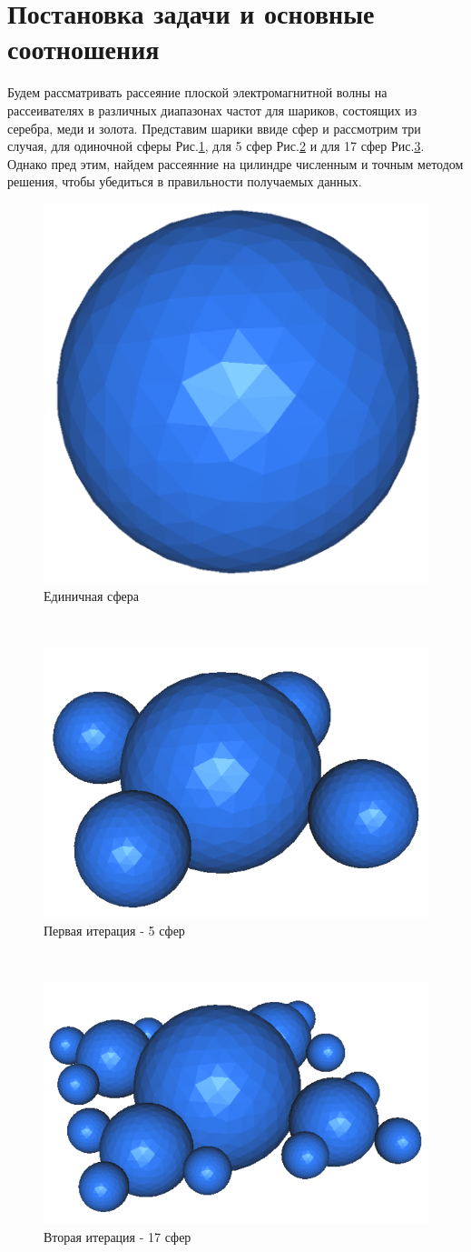 \section{Постановка задачи и основные соотношения}
Будем рассматривать рассеяние плоской электромагнитной волны на рассеивателях в различных диапазонах частот для шариков, состоящих из серебра, меди и золота. Представим шарики ввиде сфер и рассмотрим три случая, для одиночной сферы Рис.\ref{fig:1st_scatterer}, для 5 сфер Рис.\ref{fig:2nd_scatterer} и для 17 сфер Рис.\ref{fig:3td_scatterer}. Однако пред этим, найдем рассеянние на цилиндре численным и точным методом решения, чтобы убедиться в правильности получаемых данных. \\
\begin{figure}[h!]
	\centering
	\includegraphics[width=0.4\linewidth]{1st_scatterer}
	\caption{Единичная сфера}
	\label{fig:1st_scatterer}
\end{figure} \\
\begin{figure}[h!]
	\centering
	\includegraphics[width=0.5\linewidth]{2nd_scatterer}
	\caption{Первая итерация - 5 сфер}
	\label{fig:2nd_scatterer}
\end{figure} \\
\begin{figure}[h!]
	\centering
	\includegraphics[width=0.5\linewidth]{3td_scatterer}
	\caption{Вторая итерация - 17 сфер}
	\label{fig:3td_scatterer}
\end{figure} \\
